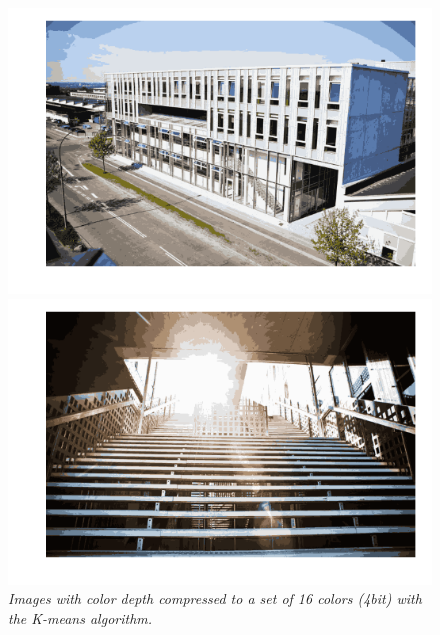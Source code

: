 \documentclass[a4paper,10pt,article,oneside,english]{memoir}
\let\oldcaption\caption
\renewcommand{\caption}[1]{\oldcaption{\emph{#1}}}
\begin{document}
\begin{figure}
	\centering
	\begin{minipage}{.48\textwidth}
		\includegraphics[width=\textwidth]{nygaard_facade_k16.png}
	\end{minipage}
	\hfill
	\begin{minipage}{.48\textwidth}
		\includegraphics[width=\textwidth]{nygaard_stairs_k16.png}
	\end{minipage}
	\caption{Images with color depth compressed to a set of 16 colors (4bit) with the K-means algorithm.}
	\label{fig:comp16}
\end{figure}
\end{document}
